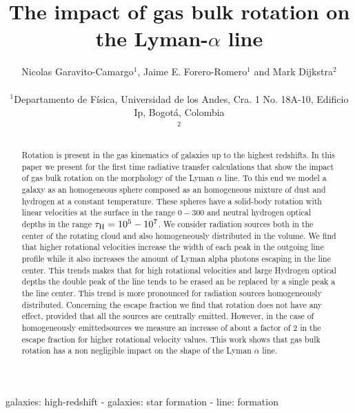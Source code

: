 \documentclass[usenatbib]{mn2e}
\newcommand{\kms}{{\ifmmode{{\mathrm{\,km\ s}^{-1}}}\else{\,km~s$^{-1}$}\fi}}
\begin{document}
\title[Rotation in the Lyman-$\alpha$ line]{The impact of gas bulk
  rotation on the Lyman-$\alpha$ line} 
\author[Garavito-Camargo, Forero-Romero \& Dijkstra]{
\parbox[t]{\textwidth}{\raggedright 
  Nicolas Garavito-Camargo$^{1}$,
  Jaime E. Forero-Romero$^{1}$ and 
  Mark Dijkstra$^2$
}
\vspace*{6pt}\\
$^{1}$Departamento de F\'{i}sica, Universidad de los Andes, Cra. 1
No. 18A-10, Edificio Ip, Bogot\'a, Colombia \\
$^2$
}
\maketitle

\begin{abstract}
Rotation is present in the gas kinematics of galaxies up to the
highest redshifts. In this paper we present for the first time 
radiative transfer calculations that show the impact of gas bulk rotation on
the morphology of the Lyman $\alpha$ line. To this end we model a
galaxy as an homogeneous sphere composed as an homogeneous mixture of
dust and hydrogen at a constant temperature. These spheres have a
solid-body rotation with linear velocities at the surface in the range
$0-300$ \kms and neutral hydrogen optical depths in the range
$\tau_{\rm H}=10^{5}-10^{7}$. We consider radiation sources both in
the center of the rotating cloud and also homogeneously distributed in
the volume. We find that higher rotational velocities increase the
width of each peak in the outgoing line profile while it also
increases the amount of Lyman alpha photons escaping in the line
center. This trends makes that for high rotational velocities and
large Hydrogen optical depths the double peak of the line tends to be
erased an be replaced by a single peak a the line center. This trend
is more pronounced for radiation sources homogeneously
distributed. Concerning the escape fraction we find that rotation does
not have any effect, provided that all the sources are centrally
emitted. However, in the case of homogeneously emittedsources we
measure an increase of about a factor of $2$ in the escape  fraction
for higher rotational velocity values. This work shows that gas bulk
rotation has a non negligible impact on the shape of the Lyman
$\alpha$ line.   
\end{abstract}
\begin{keywords}
galaxies: high-redshift - galaxies: star formation - line: formation
\end{keywords}
\end{document}
